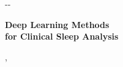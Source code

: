 \begin{titlepage}
\begin{adjustwidth*}{}{-\marginparwidth-\marginparsep}
\begin{center}

    \vfill
    
    \begingroup
        \Huge
        {\selectfont \sffamily \textbf{Deep Learning Methods\\for Clinical Sleep Analysis}}
    \endgroup
    
    \bigskip 
    
    \bigskip
    
    \begingroup
        \LARGE
        {\selectfont \sffamily \myName}
    \endgroup
    
    
    \bigskip
    
    \begingroup
        \Large
        {\selectfont \sffamily \myDocument, \myTime}
    \endgroup
    
    \vfill
    
    \vfill
    
\end{center}
\end{adjustwidth*}
\end{titlepage}
